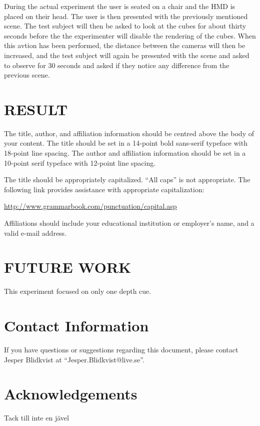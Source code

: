 \documentclass[tog]{acmsiggraph}
\begin{document}
During the actual experiment the user is seated on a chair and the HMD is placed on their head. The user is then presented with the previously mentioned scene. The test subject will then be asked to look at the cubes for about thirty seconds before the the experimenter will disable the rendering of the cubes. When this avtion has been performed, the distance between the cameras will then be increased, and the test subject will again be presented with the scene and asked to observe for 30 seconds and asked if they notice any difference from the previous scene.  

\section{RESULT}

The title, author, and affiliation information should be centred
above the body of your content. The title should be set in a 14-point
bold sans-serif typeface with 18-point line spacing. The author and
affiliation information should be set in a 10-point serif typeface
with 12-point line spacing.

The title should be appropriately capitalized. ``All caps'' is not
appropriate. The following link provides assistance with appropriate
capitalization:

{\small\url{http://www.grammarbook.com/punctuation/capital.asp}}

Affiliations should include your educational institution or employer's
name, and a valid e-mail address.

\section{FUTURE WORK}

This experiment focused on only one depth cue. 




\section{Contact Information}

If you have questions or suggestions regarding this document, please
contact Jesper Blidkvist at ``Jesper.Blidkvist@live.se''.

\section*{Acknowledgements}

Tack till inte en jävel


\nocite{*}

\end{document}
